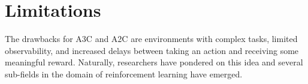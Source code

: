 \documentclass[conference]{IEEEtran}
\begin{document}
\section{Limitations}




The drawbacks for A3C and A2C are environments with complex tasks, limited observability, and increased delays between taking an action and receiving some meaningful reward. Naturally, researchers have pondered on this idea and several sub-fields in the domain of reinforcement learning have emerged.


\end{document}
